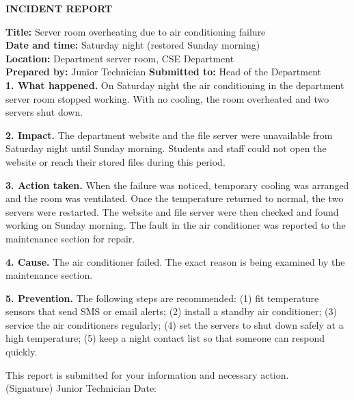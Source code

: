 \documentclass[11pt,a4paper]{article}
\begin{document}
\begin{shaded}
\small
\begin{center}\textbf{INCIDENT REPORT}\end{center}
\textbf{Title:} Server room overheating due to air conditioning failure\\
\textbf{Date and time:} Saturday night (restored Sunday morning)\\
\textbf{Location:} Department server room, CSE Department\\
\textbf{Prepared by:} Junior Technician \hspace{1em} \textbf{Submitted to:} Head of the Department\\[6pt]
\textbf{1. What happened.} On Saturday night the air conditioning in the department server room stopped working. With no cooling, the room overheated and two servers shut down.

\textbf{2. Impact.} The department website and the file server were unavailable from Saturday night until Sunday morning. Students and staff could not open the website or reach their stored files during this period.

\textbf{3. Action taken.} When the failure was noticed, temporary cooling was arranged and the room was ventilated. Once the temperature returned to normal, the two servers were restarted. The website and file server were then checked and found working on Sunday morning. The fault in the air conditioner was reported to the maintenance section for repair.

\textbf{4. Cause.} The air conditioner failed. The exact reason is being examined by the maintenance section.

\textbf{5. Prevention.} The following steps are recommended: (1) fit temperature sensors that send SMS or email alerts; (2) install a standby air conditioner; (3) service the air conditioners regularly; (4) set the servers to shut down safely at a high temperature; (5) keep a night contact list so that someone can respond quickly.

This report is submitted for your information and necessary action.\\[4pt]
(Signature) \hspace{2em} Junior Technician \hspace{2em} Date: \underline{\hspace{25mm}}
\end{shaded}
\end{document}
